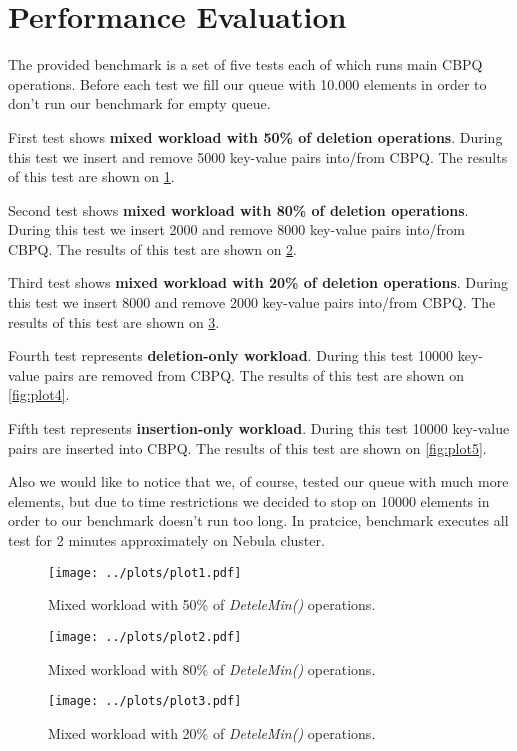 \documentclass{article}
\begin{document}
\section{Performance Evaluation}
The provided benchmark is a set of five tests each of which runs main CBPQ operations. Before each test we fill our queue with 10.000 elements in order to don't run our benchmark for empty queue.\par
First test shows\textbf{ mixed workload with 50\% of deletion operations}. During this test we insert and remove 5000 key-value pairs into/from CBPQ. The results of this test are shown on \cref{fig:plot1}.\par
Second test shows \textbf{mixed workload with 80\% of deletion operations}. During this test we insert 2000 and remove 8000 key-value pairs into/from CBPQ. The results of this test are shown on \cref{fig:plot2}.\par
Third test shows \textbf{mixed workload with 20\% of deletion operations}. During this test we insert 8000 and remove 2000 key-value pairs into/from CBPQ. The results of this test are shown on \cref{fig:plot3}.\par
Fourth test represents \textbf{deletion-only workload}. During this test 10000 key-value pairs are removed from CBPQ. The results of this test are shown on \cref{fig:plot4}.\par
Fifth test represents \textbf{insertion-only workload}. During this test 10000 key-value pairs are inserted into CBPQ. The results of this test are shown on \cref{fig:plot5}.\par
Also we would like to notice that we, of course, tested our queue with much more elements, but due to time restrictions we decided to stop on 10000 elements in order to our benchmark doesn't run too long. In pratcice,  benchmark executes all test for 2 minutes approximately on Nebula cluster.

\begin{figure}[H]
  \centering
  \texttt{[image: ../plots/plot1.pdf]}
  \caption{Mixed workload with 50\% of \textit{DeteleMin()} operations.}
  \label{fig:plot1}
\end{figure}

\begin{figure}[H]
  \centering
  \texttt{[image: ../plots/plot2.pdf]}
  \caption{Mixed workload with 80\% of \textit{DeteleMin()} operations.}
  \label{fig:plot2}
\end{figure}

\begin{figure}[H]
  \centering
  \texttt{[image: ../plots/plot3.pdf]}
  \caption{Mixed workload with 20\% of \textit{DeteleMin()} operations.}
  \label{fig:plot3}
\end{figure}
\end{document}
